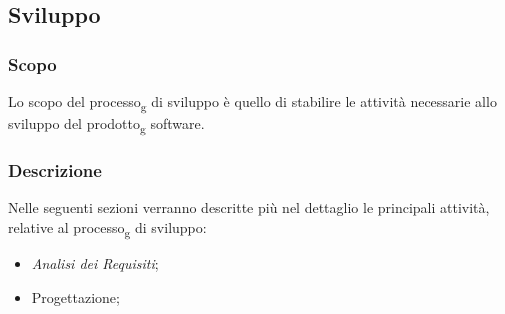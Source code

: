 \subsection{Sviluppo}

\subsubsection{Scopo}
Lo scopo del processo\textsubscript{g} di sviluppo è quello di stabilire le attività necessarie allo sviluppo del prodotto\textsubscript{g} software.

\subsubsection{Descrizione}
Nelle seguenti sezioni verranno descritte più nel dettaglio le principali attività, relative al processo\textsubscript{g} di sviluppo:
\begin{itemize} 
    \item \textit{Analisi dei Requisiti};
	\item Progettazione;
\end{itemize}


